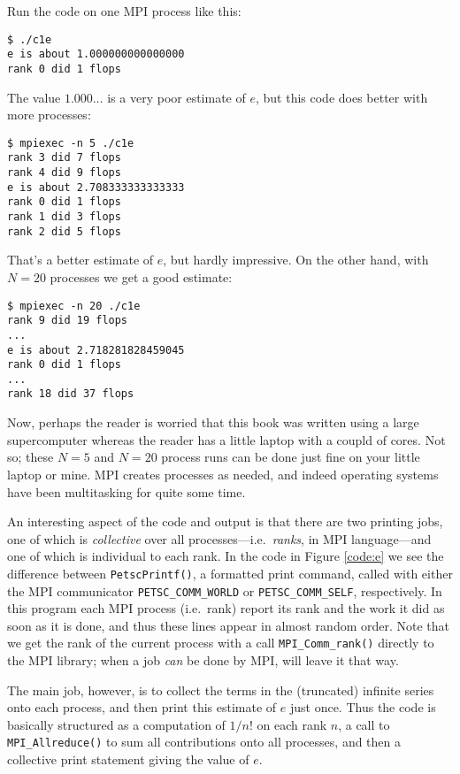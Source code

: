 
Run the code on one MPI process like this:
\begin{Verbatim}[fontsize=\small]
$ ./c1e
e is about 1.000000000000000
rank 0 did 1 flops
\end{Verbatim}
The value $1.000\dots$ is a very poor estimate of $e$, but this code does better with more processes:
\begin{Verbatim}[fontsize=\small]
$ mpiexec -n 5 ./c1e
rank 3 did 7 flops
rank 4 did 9 flops
e is about 2.708333333333333
rank 0 did 1 flops
rank 1 did 3 flops
rank 2 did 5 flops
\end{Verbatim}
That's a better estimate of $e$, but hardly impressive.  On the other hand, with $N=20$ processes we get a good estimate:
\begin{Verbatim}[fontsize=\small]
$ mpiexec -n 20 ./c1e
rank 9 did 19 flops
...
e is about 2.718281828459045
rank 0 did 1 flops
...
rank 18 did 37 flops
\end{Verbatim}


Now, perhaps the reader is worried that this book was written using a large supercomputer whereas the reader has a little laptop with a coupld of cores.  Not so; these $N=5$ and $N=20$ process runs can be done just fine on your little laptop or mine.  MPI creates processes as needed, and indeed operating systems have been multitasking for quite some time.

An interesting aspect of the code and output is that there are two printing jobs, one of which is \emph{collective} over all processes---i.e.~\emph{ranks}, in MPI language---and one of which is individual to each rank.  In the code in Figure \ref{code:e} we see the difference between \texttt{PetscPrintf()}, a formatted print command, called with either the MPI communicator \texttt{PETSC\_COMM\_WORLD} or \texttt{PETSC\_COMM\_SELF}, respectively.  In this program each MPI process (i.e.~rank) report its rank and the work it did as soon as it is done, and thus these lines appear in almost random order.  Note that we get the rank of the current process with a call \texttt{MPI\_Comm\_rank()} directly to the MPI library; when a job \emph{can} be done by MPI, \PETSc will leave it that way.

The main job, however, is to collect the terms in the (truncated) infinite series onto each process, and then print this estimate of $e$ just once.  Thus the code is basically structured as a computation of $1/n!$ on each rank $n$, a call to \texttt{MPI\_Allreduce()} to sum all contributions onto all processes, and then a collective print statement giving the value of $e$.

